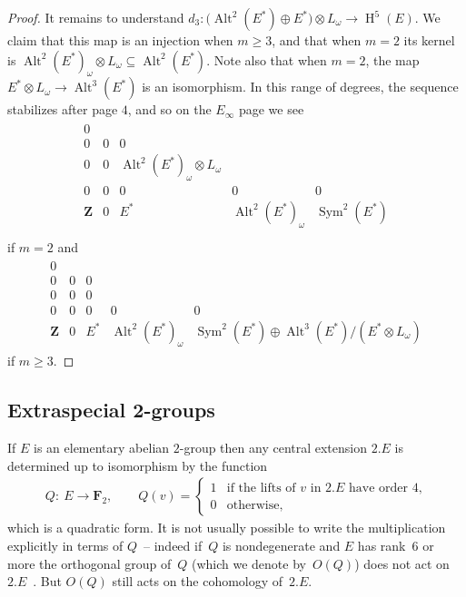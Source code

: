 \documentclass[pdftex]{sigma}
\numberwithin{equation}{section}
\newcommand\bF{\mathbf F}
\newcommand\bZ{\mathbf Z}
\DeclareMathOperator\homology{H}
\renewcommand\H{\homology}
\newcommand\<\langle
\renewcommand\>\rangle
\DeclareMathOperator\Sym{Sym}
\DeclareMathOperator\Alt{Alt}
\begin{document}
\begin{proof}
It remains to understand $d_3\colon \big(\Alt^2(E^*) \oplus E^*\big) \otimes L_{\omega} \to \H^5(E)$.
We claim that this map is an injection when $m\geq 3$, and that when $m=2$ its kernel is $\Alt^2(E^*)_\omega \otimes L_{\omega} \subseteq \Alt^2(E^*)$.
Note also that when $m=2$, the map $E^* \otimes L_{\omega} \to \Alt^3(E^*)$ is an isomorphism.
In this range of degrees, the sequence stabilizes after page $4$,
 and so on the $E_\infty$ page we see
\begin{gather*}
 \begin{array}{ccccc}
 0 \\
 0 & 0 & 0 \\
 0 & 0 & \Alt^2(E^*)_\omega \otimes L_{\omega} \\
 0 & 0 & 0 & 0 & 0 \\
 \bZ & 0 & E^* & \Alt^2(E^*)_\omega & \Sym^2(E^*) \\
 \end{array}
\end{gather*} if $m=2$ and
\begin{gather*}
 \begin{array}{ccccc}
 0 \\
 0 & 0 & 0 \\
 0 & 0 & 0 \\
 0 & 0 & 0 & 0 & 0 \\
 \bZ & 0 & E^* & \Alt^2(E^*)_\omega & \Sym^2(E^*) \oplus \Alt^3(E^*)/(E^* \otimes L_\omega)
 \end{array}
\end{gather*}
if $m\geq 3$.\end{proof}

\subsection{Extraspecial 2-groups} \label{sub.extraspecial 2group}

If $E$ is an elementary abelian $2$-group then any central extension $2.E$ is determined up to isomorphism by the function
\begin{gather*}
Q\colon \ E \to \bF_2, \qquad Q(v) = \begin{cases} 1 & \text{if the lifts of $v$ in $2.E$ have order $4$,}
\\
0 & \text{otherwise,}
\end{cases}
\end{gather*}
which is a quadratic form. It is not usually possible to write the multiplication explicitly in terms of $Q$~-- indeed if~$Q$ is nondegenerate and $E$ has rank~$6$ or more the orthogonal group of~$Q$ (which we denote by~$O(Q)$) does not act on $2.E$~\cite{MR0476878}. But $O(Q)$ still acts on the cohomology of~$2.E$.
\end{document}
